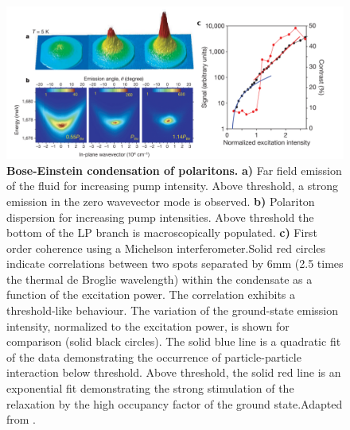 \begin{figure}[H]
    \centering
    \includegraphics[width=1\linewidth]{chap_theory/fig/polariton_bec.pdf}
    \caption{\textbf{Bose-Einstein condensation of polaritons.} \textbf{a)} Far field emission of the fluid for increasing pump intensity. Above threshold, a strong emission in the zero wavevector mode is observed. \textbf{b)} Polariton dispersion for increasing pump intensities. Above threshold the bottom of the LP branch is macroscopically populated.
     \textbf{c)} First order coherence using a Michelson interferometer.Solid red circles indicate correlations between two spots separated by 6mm (2.5 times the thermal de Broglie wavelength) within the condensate as a function of the excitation power. The correlation exhibits a threshold-like behaviour. 
     The variation of the ground-state emission intensity, normalized to the excitation power, is shown for comparison (solid black circles). The solid blue line is a quadratic fit of the data demonstrating the occurrence of particle-particle interaction below threshold. Above threshold, the solid red line is an exponential fit demonstrating the strong stimulation of the relaxation by the high occupancy factor of the ground state.Adapted from \cite{kasprzak_boseeinstein_2006}.}
    \label{fig:polariton_bec}
\end{figure}

\bigskip

